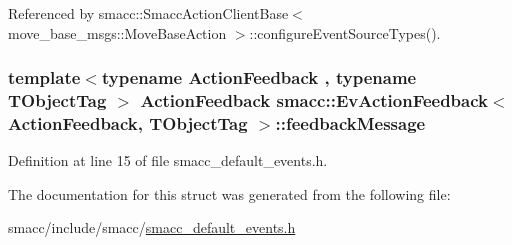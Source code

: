 Referenced by smacc\+::\+Smacc\+Action\+Client\+Base$<$ move\+\_\+base\+\_\+msgs\+::\+Move\+Base\+Action $>$\+::configure\+Event\+Source\+Types().

\subsubsection[{\texorpdfstring{feedback\+Message}{feedbackMessage}}]{\setlength{\rightskip}{0pt plus 5cm}template$<$typename Action\+Feedback , typename T\+Object\+Tag $>$ Action\+Feedback {\bf smacc\+::\+Ev\+Action\+Feedback}$<$ Action\+Feedback, T\+Object\+Tag $>$\+::feedback\+Message}\hypertarget{structsmacc_1_1EvActionFeedback_ae00f5e85eb9cec0d02ca394460d60015}{}\label{structsmacc_1_1EvActionFeedback_ae00f5e85eb9cec0d02ca394460d60015}


Definition at line 15 of file smacc\+\_\+default\+\_\+events.\+h.



The documentation for this struct was generated from the following file\+:\begin{DoxyCompactItemize}
\item 
smacc/include/smacc/\hyperlink{smacc__default__events_8h}{smacc\+\_\+default\+\_\+events.\+h}\end{DoxyCompactItemize}
